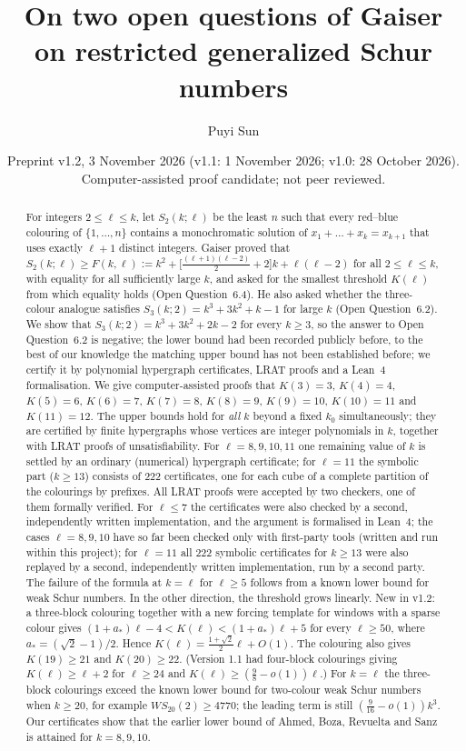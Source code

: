 \documentclass[11pt]{amsart}
\title[Two open questions on restricted generalized Schur numbers]{On two open questions of Gaiser on restricted generalized Schur numbers}
\author{Puyi Sun}
\date{Preprint v1.2, 3 November 2026 (v1.1: 1 November 2026; v1.0: 28 October 2026). Computer-assisted proof candidate; not peer reviewed.}
\theoremstyle{definition}
\newcommand{\F}{F}
\newcommand{\Stwo}{S_2}
\begin{document}
\begin{abstract}
For integers $2\le \ell\le k$, let $\Stwo(k;\ell)$ be the least $n$ such that every red--blue colouring of $\{1,\dots,n\}$ contains a monochromatic solution of $x_1+\dots+x_k=x_{k+1}$ that uses exactly $\ell+1$ distinct integers. Gaiser proved that $\Stwo(k;\ell)\ge \F(k,\ell):=k^2+\bigl[\tfrac{(\ell+1)(\ell-2)}{2}+2\bigr]k+\ell(\ell-2)$ for all $2\le\ell\le k$, with equality for all sufficiently large $k$, and asked for the smallest threshold $K(\ell)$ from which equality holds (Open Question~6.4). He also asked whether the three-colour analogue satisfies $S_3(k;2)=k^3+3k^2+k-1$ for large $k$ (Open Question~6.2). We show that $S_3(k;2)=k^3+3k^2+2k-2$ for every $k\ge3$, so the answer to Open Question~6.2 is negative; the lower bound had been recorded publicly before, to the best of our knowledge the matching upper bound has not been established before; we certify it by polynomial hypergraph certificates, LRAT proofs and a Lean~4 formalisation. We give computer-assisted proofs that $K(3)=3$, $K(4)=4$, $K(5)=6$, $K(6)=7$, $K(7)=8$, $K(8)=9$, $K(9)=10$, $K(10)=11$ and $K(11)=12$. The upper bounds hold for \emph{all} $k$ beyond a fixed $k_0$ simultaneously; they are certified by finite hypergraphs whose vertices are integer polynomials in $k$, together with LRAT proofs of unsatisfiability. For $\ell=8,9,10,11$ one remaining value of $k$ is settled by an ordinary (numerical) hypergraph certificate; for $\ell=11$ the symbolic part ($k\ge13$) consists of 222 certificates, one for each cube of a complete partition of the colourings by prefixes. All LRAT proofs were accepted by two checkers, one of them formally verified. For $\ell\le7$ the certificates were also checked by a second, independently written implementation, and the argument is formalised in Lean~4; the cases $\ell=8,9,10$ have so far been checked only with first-party tools (written and run within this project); for $\ell=11$ all 222 symbolic certificates for $k\ge13$ were also replayed by a second, independently written implementation, run by a second party. The failure of the formula at $k=\ell$ for $\ell\ge5$ follows from a known lower bound for weak Schur numbers. In the other direction, the threshold grows linearly. New in v1.2: a three-block colouring together with a new forcing template for windows with a sparse colour gives $(1+a_*)\ell-4<K(\ell)<(1+a_*)\ell+5$ for every $\ell\ge50$, where $a_*=(\sqrt2-1)/2$. Hence $K(\ell)=\frac{1+\sqrt2}{2}\ell+O(1)$. The colouring also gives $K(19)\ge21$ and $K(20)\ge22$. (Version 1.1 had four-block colourings giving $K(\ell)\ge\ell+2$ for $\ell\ge24$ and $K(\ell)\ge(\frac98-o(1))\ell$.) For $k=\ell$ the three-block colourings exceed the known lower bound for two-colour weak Schur numbers when $k\ge20$, for example $WS_{20}(2)\ge4770$; the leading term is still $(\tfrac9{16}-o(1))k^3$. Our certificates show that the earlier lower bound of Ahmed, Boza, Revuelta and Sanz is attained for $k=8,9,10$.
\end{abstract}
\end{document}

